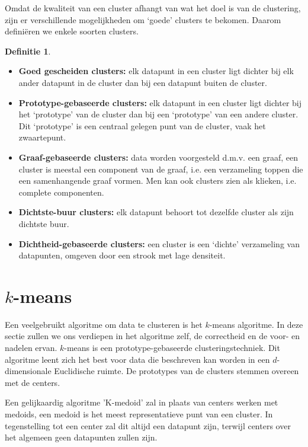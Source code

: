 \documentclass[a4paper,12pt]{article}
\theoremstyle{definition}
\newtheorem{definition}{Definitie}[subsection]
\begin{document}
Omdat de kwaliteit van een cluster afhangt van wat het doel is van de clustering,
zijn er verschillende mogelijkheden om `goede' clusters te bekomen. Daarom 
definiëren we enkele soorten clusters.

\begin{definition}
\item
 \begin{itemize}
  \item \textbf{Goed gescheiden clusters:} elk datapunt in een cluster ligt dichter bij
	elk ander datapunt in de cluster dan bij een datapunt buiten de cluster.
  \item \textbf{Prototype-gebaseerde clusters:} elk datapunt in een cluster ligt
	dichter bij het `prototype' van de cluster dan bij een `prototype' van
	een andere cluster. Dit `prototype' is een centraal gelegen
	punt van de cluster, vaak het zwaartepunt.
  \item \textbf{Graaf-gebaseerde clusters:} data worden voorgesteld d.m.v. een
	graaf, een cluster is meestal een component van de graaf, i.e. een verzameling
	toppen die een samenhangende graaf vormen. Men kan ook clusters zien als klieken,
	i.e. complete componenten.
  \item \textbf{Dichtste-buur clusters:} elk datapunt behoort tot dezelfde
	cluster als zijn dichtste buur.
  \item \textbf{Dichtheid-gebaseerde clusters:} een cluster is een `dichte' verzameling
	van datapunten, omgeven door een strook met lage densiteit.
 \end{itemize}

\end{definition}

\newpage
\section{$k$-means}
\label{sec_kmeans}
Een veelgebruikt algoritme om data te clusteren is het $k$-means algoritme.
In deze sectie zullen we ons verdiepen in het algoritme zelf, de correctheid en
de voor- en nadelen ervan. $k$-means is een prototype-gebaseerde clusteringstechniek.
Dit algoritme leent zich het best voor data die beschreven kan worden in een
$d$-dimensionale Euclidische ruimte. De prototypes van de clusters stemmen overeen
met de centers.

Een gelijkaardig algoritme 'K-medoid' zal in plaats van centers werken met
medoids, een medoid is het meest representatieve punt van een cluster. In
tegenstelling tot een center zal dit altijd een datapunt zijn, terwijl
centers over het algemeen geen datapunten zullen zijn.
\end{document}
